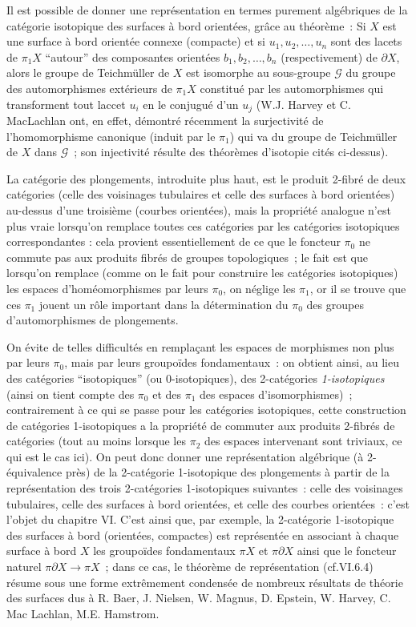 Il est possible de donner une représentation en termes purement algébriques de la catégorie isotopique des surfaces à bord orientées, grâce au théorème~: Si $X$ est une surface à bord orientée connexe (compacte) et si $u_1, u_2, \dots, u_n$ sont des lacets de $\pi_1 X$ ``autour'' des composantes orientées $b_1, b_2, \dots, b_n$ (respectivement) de $\partial X$, alors le groupe de Teichmüller de $X$ est isomorphe au sous-groupe $\mathcal{G}$ du groupe des automorphismes extérieurs de $\pi_1 X$ constitué par les automorphismes qui transforment tout laccet $u_i$ en le conjugué d'un $u_j$ (W.J. Harvey et C. MacLachlan ont, en effet, démontré récemment la surjectivité de l'homomorphisme canonique (induit par le $\pi_1$) qui va du groupe de Teichmüller de $X$ dans $\mathcal{G}$~; son injectivité résulte des théorèmes d'isotopie cités ci-dessus).

La catégorie des plongements, introduite plus haut, est le produit 2-fibré de deux catégories (celle des voisinages tubulaires et celle des surfaces à bord orientées) au-dessus d'une troisième (courbes orientées), mais la propriété analogue n'est plus vraie lorsqu'on remplace toutes ces catégories par les catégories isotopiques correspondantes : cela provient essentiellement de ce que le foncteur $\pi_0$ ne commute pas aux produits fibrés de groupes topologiques~; le fait est que lorsqu'on remplace (comme on le fait pour construire les catégories isotopiques) les espaces d'homéomorphismes par leurs $\pi_0$, on néglige les $\pi_1$, or il se trouve que ces $\pi_1$ jouent un rôle important dans la détermination du $\pi_0$ des groupes d'automorphismes de plongements. 

On évite de telles difficultés en remplaçant les espaces de morphismes non plus par leurs $\pi_0$, mais par leurs groupoïdes fondamentaux~: on obtient ainsi, au lieu des catégories ``isotopiques'' (ou 0-isotopiques), des 2-catégories \emph{1-isotopiques} (ainsi on tient compte des $\pi_0$ et des $\pi_1$ des espaces d'isomorphismes)~; contrairement à ce qui se passe pour les catégories isotopiques, cette construction de catégories 1-isotopiques a la propriété de commuter aux produits 2-fibrés de catégories (tout au moins lorsque les $\pi_2$ des espaces intervenant sont triviaux, ce qui est le cas ici). On peut donc donner une représentation algébrique (à 2-équivalence près) de la 2-catégorie 1-isotopique des plongements à partir de la représentation des trois 2-catégories 1-isotopiques suivantes~: celle des voisinages tubulaires, celle des surfaces à bord orientées, et celle des courbes orientées~: c'est l'objet du chapitre VI. C'est ainsi que, par exemple, la 2-catégorie 1-isotopique des surfaces à bord (orientées, compactes) est représentée en associant à chaque surface à bord $X$ les groupoïdes fondamentaux $\pi X$ et $\pi\partial X$ ainsi que le foncteur naturel $\pi\partial X \rightarrow \pi X$~; dans ce cas, le théorème de représentation (cf.VI.6.4) résume sous une forme extrêmement condensée de nombreux résultats de théorie des surfaces dus à R. Baer, J. Nielsen, W. Magnus, D. Epstein, W. Harvey, C. Mac Lachlan, M.E. Hamstrom. 

